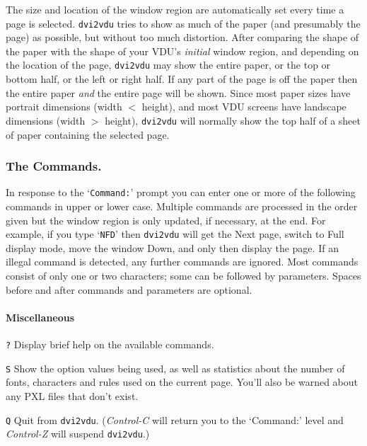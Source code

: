 The size and location of the window region are automatically set
every time a page is selected.
{\tt dvi2vdu} tries to show as much of the
paper (and presumably the page) as possible, but without too much distortion.
After comparing the shape of the paper with the shape of your
VDU's {\em initial} window region, and depending on the location of the
page, {\tt dvi2vdu} may show the entire paper,
or the top or bottom half, or the left or right half.
If any part of the page is off the paper then the entire paper {\em and} the
entire page will be shown.
Since most paper sizes have portrait dimensions (width $<$ height), and most
VDU screens have landscape dimensions (width $>$ height), {\tt dvi2vdu} will
normally show the top half of a sheet of paper containing the selected page.


\subsubsection{The Commands.}

In response to the `{\tt Command:}' prompt you can enter one or more of the
following commands in upper or lower case.  Multiple commands are
processed in the order given but the window region is only updated,
if necessary, at the end.  For example,
if you type `{\tt NFD}' then {\tt dvi2vdu} will get the Next page, switch to
Full display mode, move the window Down, and only then display the page.
If an illegal command is detected, any further commands are ignored.
Most commands consist of only one or two characters; some can be followed by
parameters.  Spaces before and after commands and parameters are optional.







\paragraph{Miscellaneous}
\begin{list}%
{}%
{\settowidth{\labelwidth}{\tt S}
\settowidth{\labelsep}{aaaa}
\settowidth{\rightmargin}{aaa}
\addtolength{\labelwidth}{\labelsep}
\setlength{\leftmargin}{\labelwidth}}


\item[\tt ?]Display brief help on the available commands.
\item[\tt S]
Show the option values being used, as well as statistics about the number of
fonts, characters and rules used on the current page.
You'll also be warned about any PXL files that don't exist.
\item[\tt Q]
Quit from {{\tt dvi2vdu}}\null.
({\em Control-C} will return you to the `Command:' level and 
{\em Control-Z} will suspend {\tt dvi2vdu}.)
\end{list}

